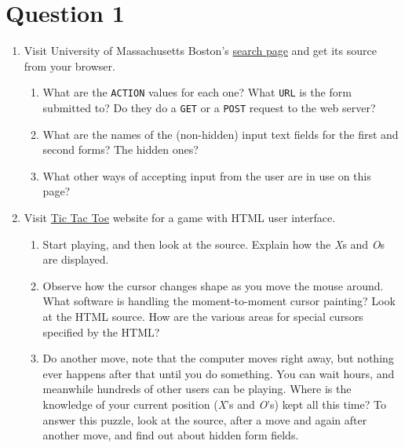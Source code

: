 
\section*{Question 1}

\begin{enumerate}[label=(\alph*)]

\item
Visit University of Massachusetts Boston's \href{http://www2.www.umb.edu/directory/search1.php}{search page} and get its source from your browser.

\begin{enumerate}[label=(\roman*)]

\item
What are the \texttt{ACTION} values for each one? What \texttt{URL} is the form submitted to? Do they do a \texttt{GET} or a \texttt{POST} request to the web server?

\item What are the names of the (non-hidden) input text fields for the first and second forms? The hidden ones?

\item What other ways of accepting input from the user are in use on this page?
\end{enumerate}

\item Visit \href{http://boulter.com/ttt}{Tic Tac Toe} website for a game with HTML user interface.

\begin{enumerate}[label=(\roman*)]
\item Start playing, and then look at the source.
Explain how the \textit{X}s and \textit{O}s are displayed.

\item Observe how the cursor changes shape as you move the mouse around.
What software is handling the moment-to-moment cursor painting? Look at the HTML source.
How are the various areas for special cursors specified by the HTML?

\item Do another move, note that the computer moves right away, but nothing ever happens after that until you do something.
You can wait hours, and meanwhile hundreds of other users can be playing.
Where is the knowledge of your current position (\textit{X}'s and \textit{O}'s) kept all this time? To answer this puzzle, look at the source, after a move and again after another move, and find out about hidden form fields.
\end{enumerate}

\end{enumerate}

